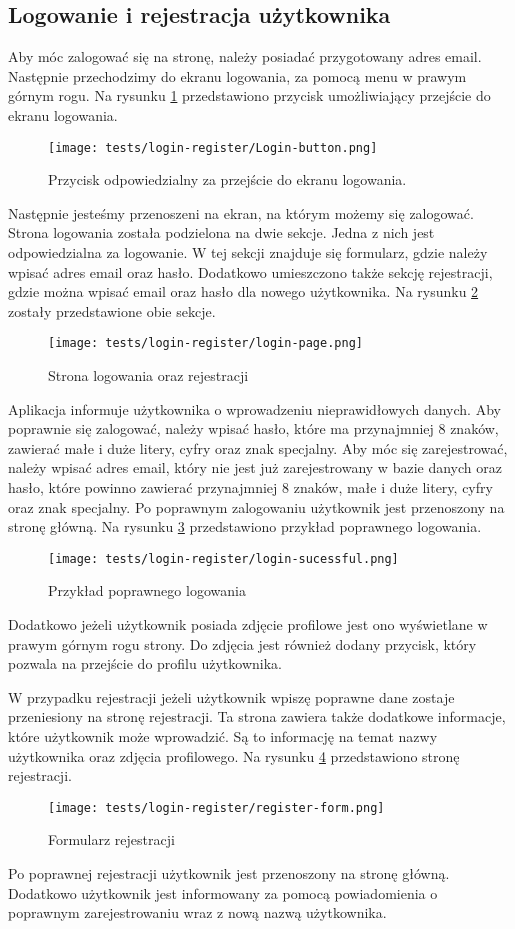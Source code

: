 \subsection{Logowanie i rejestracja użytkownika}
Aby móc zalogować się na stronę, należy posiadać przygotowany adres email. Następnie przechodzimy do ekranu logowania, za pomocą menu w prawym górnym rogu. Na rysunku \ref{login_menu} przedstawiono przycisk umożliwiający przejście do ekranu logowania.
\begin{figure}[H]
  \centering
  \texttt{[image: tests/login-register/Login-button.png]}
  \caption{Przycisk odpowiedzialny za przejście do ekranu logowania.}
  \label{login_menu}
\end{figure}
Następnie jesteśmy przenoszeni na ekran, na którym możemy się zalogować. Strona logowania została podzielona na dwie sekcje. Jedna z nich jest odpowiedzialna za logowanie. W tej sekcji znajduje się formularz, gdzie należy wpisać adres email oraz hasło. Dodatkowo umieszczono także sekcję rejestracji, gdzie można wpisać email oraz hasło dla nowego użytkownika. Na rysunku \ref{login_page} zostały przedstawione obie sekcje.
\begin{figure}[H]
  \centering
  \texttt{[image: tests/login-register/login-page.png]}
  \caption{Strona logowania oraz rejestracji}
  \label{login_page}
\end{figure}
Aplikacja informuje użytkownika o wprowadzeniu nieprawidłowych danych. Aby poprawnie się zalogować, należy wpisać hasło, które ma przynajmniej 8 znaków, zawierać małe i duże litery, cyfry oraz znak specjalny. Aby móc się zarejestrować, należy wpisać adres email, który nie jest już zarejestrowany w bazie danych oraz hasło, które powinno zawierać przynajmniej 8 znaków, małe i duże litery, cyfry oraz znak specjalny. Po poprawnym zalogowaniu użytkownik jest przenoszony na stronę główną. Na rysunku \ref{login_success} przedstawiono przykład poprawnego logowania. 
\begin{figure}[H]
  \centering
  \texttt{[image: tests/login-register/login-sucessful.png]}
  \caption{Przykład poprawnego logowania}
  \label{login_success}
\end{figure}
Dodatkowo jeżeli użytkownik posiada zdjęcie profilowe jest ono wyświetlane w prawym górnym rogu strony. Do zdjęcia jest również dodany przycisk, który pozwala na przejście do profilu użytkownika.

W przypadku rejestracji jeżeli użytkownik wpiszę poprawne dane zostaje przeniesiony na stronę rejestracji. Ta strona zawiera także dodatkowe informacje, które użytkownik może wprowadzić. Są to informację na temat nazwy użytkownika oraz zdjęcia profilowego. Na rysunku \ref{register_page} przedstawiono stronę rejestracji.
\begin{figure}[H]
  \centering
  \texttt{[image: tests/login-register/register-form.png]}
  \caption{Formularz rejestracji}
  \label{register_page}
\end{figure}
Po poprawnej rejestracji użytkownik jest przenoszony na stronę główną. Dodatkowo użytkownik jest informowany za pomocą powiadomienia o poprawnym zarejestrowaniu wraz z nową nazwą użytkownika. 

